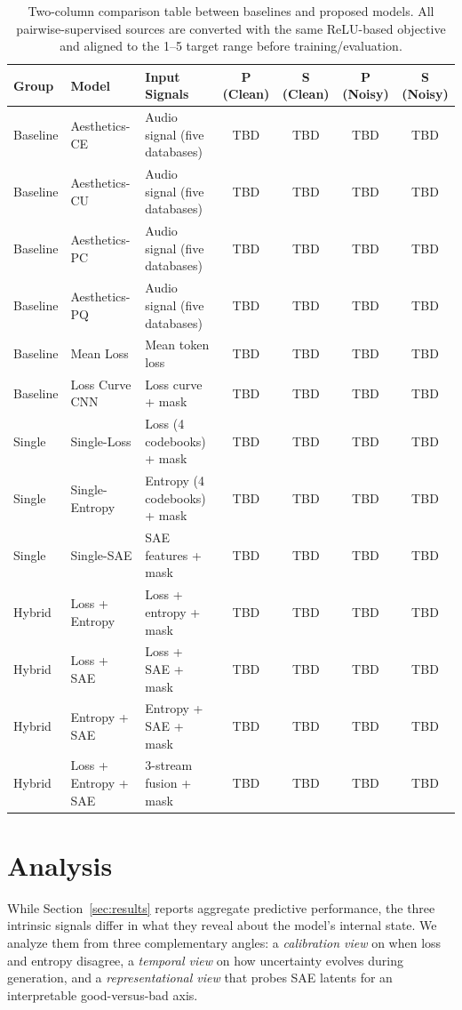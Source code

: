 \documentclass{article}
\begin{document}
\begin{table}[t]
  \centering
  \scriptsize
  \begin{tabular}{|l|l|l|c|c|c|c|}
    \hline
    Group & Model & Input Signals & P (Clean) & S (Clean) & P (Noisy) & S (Noisy) \\
    \hline
    Baseline & Aesthetics-CE & Audio signal (five databases) & TBD & TBD & TBD & TBD \\
    Baseline & Aesthetics-CU & Audio signal (five databases) & TBD & TBD & TBD & TBD \\
    Baseline & Aesthetics-PC & Audio signal (five databases) & TBD & TBD & TBD & TBD \\
    Baseline & Aesthetics-PQ & Audio signal (five databases) & TBD & TBD & TBD & TBD \\
    Baseline & Mean Loss & Mean token loss & TBD & TBD & TBD & TBD \\
    Baseline & Loss Curve CNN & Loss curve + mask & TBD & TBD & TBD & TBD \\
    \hline
    Single & Single-Loss & Loss (4 codebooks) + mask & TBD & TBD & TBD & TBD \\
    Single & Single-Entropy & Entropy (4 codebooks) + mask & TBD & TBD & TBD & TBD \\
    Single & Single-SAE & SAE features + mask & TBD & TBD & TBD & TBD \\
    \hline
    Hybrid & Loss + Entropy & Loss + entropy + mask & TBD & TBD & TBD & TBD \\
    Hybrid & Loss + SAE & Loss + SAE + mask & TBD & TBD & TBD & TBD \\
    Hybrid & Entropy + SAE & Entropy + SAE + mask & TBD & TBD & TBD & TBD \\
    Hybrid & Loss + Entropy + SAE & 3-stream fusion + mask & TBD & TBD & TBD & TBD \\
    \hline
  \end{tabular}
  \caption{%
    Two-column comparison table between baselines and proposed models.
    All pairwise-supervised sources are converted with the same ReLU-based objective
    and aligned to the 1--5 target range before training/evaluation.%
  }
  \label{tab:main_results}
\end{table}

\section{Analysis}\label{sec:analysis}

While Section~\ref{sec:results} reports aggregate predictive performance,
the three intrinsic signals differ in what they reveal about the model's internal state.
We analyze them from three complementary angles:
a \emph{calibration view} on when loss and entropy disagree,
a \emph{temporal view} on how uncertainty evolves during generation,
and a \emph{representational view} that probes SAE latents
for an interpretable good-versus-bad axis.
\end{document}

